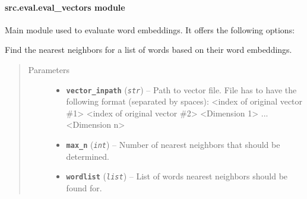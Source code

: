 \documentclass[letterpaper,10pt,english]{sphinxmanual}
\begin{document}
\paragraph{src.eval.eval\_vectors module}
\label{src.eval:src-eval-eval-vectors-module}\label{src.eval:module-src.eval.eval_vectors}\begin{description}
\item[{Main module used to evaluate word embeddings. It offers the following options:}] \leavevmode
{}

\end{description}

\begin{fulllineitems}
\label{src.eval:src.eval.eval_vectors.find_nearest_neighbors}
Find the nearest neighbors for a list of words based on their word embeddings.
\begin{quote}\begin{description}
\item[{Parameters}] \leavevmode\begin{itemize}
\item {} 
\textbf{\texttt{vector\_inpath}} (\emph{\texttt{str}}) -- Path to vector file. File has to have the following format (separated by spaces):
\textless{}index of original vector \#1\textgreater{} \textless{}index of original vector \#2\textgreater{} \textless{}Dimension 1\textgreater{} ... \textless{}Dimension n\textgreater{}

\item {} 
\textbf{\texttt{max\_n}} (\emph{\texttt{int}}) -- Number of nearest neighbors that should be determined.

\item {} 
\textbf{\texttt{wordlist}} (\emph{\texttt{list}}) -- List of words nearest neighbors should be found for.

\end{itemize}

\end{description}\end{quote}

\end{fulllineitems}
\end{document}
